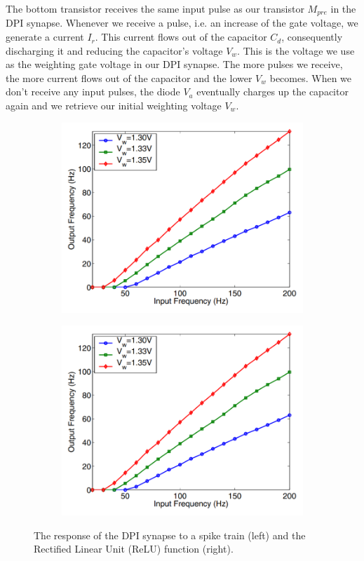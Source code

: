 The bottom transistor receives the same input pulse as our transistor $M_{pre}$ in the DPI synapse. Whenever we receive a pulse, i.e. an increase of the gate voltage, we generate a current $I_r$. This current flows out of the capacitor $C_d$, consequently discharging it and reducing the capacitor's voltage $V_w$. This is the voltage we use as the weighting gate voltage in our DPI synapse. The more pulses we receive, the more current flows out of the capacitor and the lower $V_w$ becomes. When we don't receive any input pulses, the diode $V_a$ eventually charges up the capacitor again and we retrieve our initial weighting voltage $V_w$.\\

\begin{figure}
\centering
\begin{subfigure}{.5\textwidth}
  \centering
  \includegraphics[width=\linewidth]{Figures/relu_dpi.PNG}
  \label{fig:relu_dpi}
\end{subfigure}%
\begin{subfigure}{.5\textwidth}
  \centering
  \includegraphics[width=\linewidth]{Figures/relu_dpi.PNG}
  \label{fig:relu}
\end{subfigure}
\caption{The response of the DPI synapse to a spike train (left) and the Rectified Linear Unit (ReLU) function (right).}
\end{figure}
